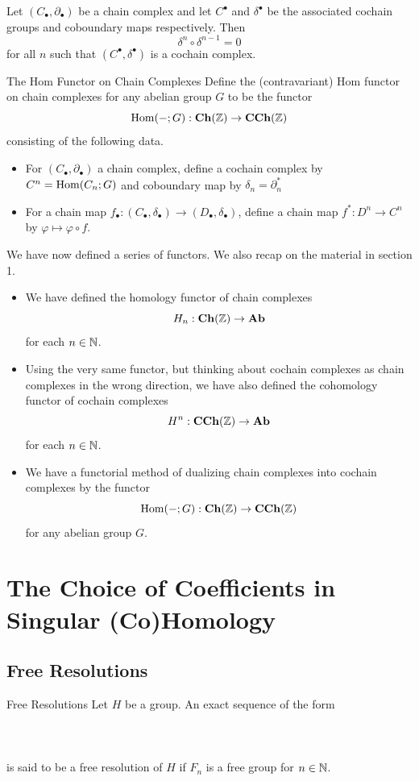 \documentclass[a4paper]{article}
\begin{document}
\begin{lmm}{}{} Let $(C_\bullet,\partial_\bullet)$ be a chain complex and let $C^\bullet$ and $\delta^\bullet$ be the associated cochain groups and coboundary maps respectively. Then $$\delta^n\circ\delta^{n-1}=0$$ for all $n$ such that $(C^\bullet,\delta^\bullet)$ is a cochain complex. 
\end{lmm}

\begin{defn}{The Hom Functor on Chain Complexes}{} Define the (contravariant) Hom functor on chain complexes for any abelian group $G$ to be the functor $$\operatorname{Hom}(-;G):\bold{Ch}(\mathbb{Z})\to\bold{CCh}(\mathbb{Z})$$ consisting of the following data. 
\begin{itemize}
\item For $(C_\bullet,\partial_\bullet)$ a chain complex, define a cochain complex by $C^n=\operatorname{Hom}(C_n;G)$ and coboundary map by $\delta_n=\partial_n^\ast$
\item For a chain map $f_\bullet:(C_\bullet,\delta_\bullet)\to(D_\bullet,\delta_\bullet)$, define a chain map $f^\ast:D^n\to C^n$ by $\varphi\mapsto\varphi\circ f$. 
\end{itemize}
\end{defn}

We have now defined a series of functors. We also recap on the material in section 1. 
\begin{itemize}
\item We have defined the homology functor of chain complexes $$H_n:\bold{Ch}(\mathbb{Z})\to\bold{Ab}$$ for each $n\in\mathbb{N}$. 
\item Using the very same functor, but thinking about cochain complexes as chain complexes in the wrong direction, we have also defined the cohomology functor of cochain complexes $$H^n:\bold{CCh}(\mathbb{Z})\to\bold{Ab}$$ for each $n\in\mathbb{N}$. 
\item We have a functorial method of dualizing chain complexes into cochain complexes by the functor $$\operatorname{Hom}(-;G):\bold{Ch}(\mathbb{Z})\to\bold{CCh}(\mathbb{Z})$$ for any abelian group $G$. 
\end{itemize}

\pagebreak
\section{The Choice of Coefficients in Singular (Co)Homology}
\subsection{Free Resolutions}
\begin{defn}{Free Resolutions}{} Let $H$ be a group. An exact sequence of the form \\~\\
\\~\\
is said to be a free resolution of $H$ if $F_n$ is a free group for $n\in\mathbb{N}$. 
\end{defn}
\end{document}
